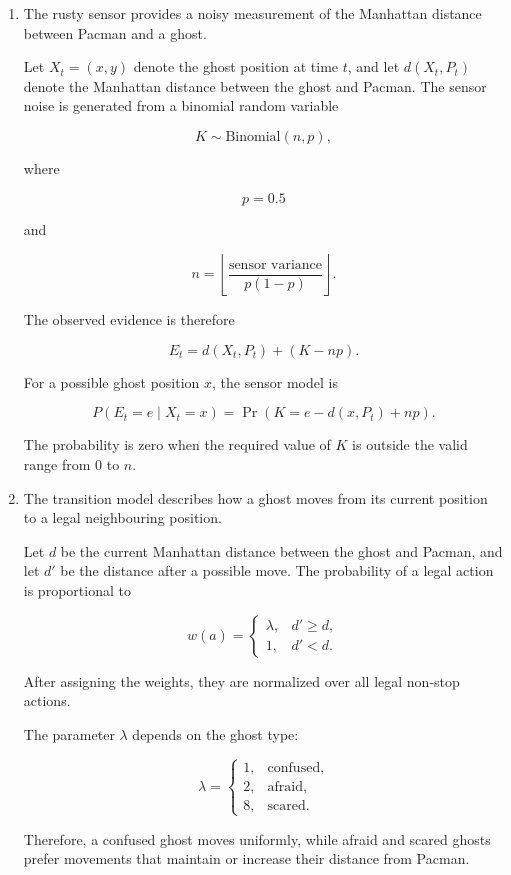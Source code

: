 \documentclass{article}
\begin{document}
\begin{enumerate}[label=\alph*.,leftmargin=*]

    \item
    The rusty sensor provides a noisy measurement of the Manhattan distance
    between Pacman and a ghost.

    Let $X_t=(x,y)$ denote the ghost position at time $t$, and let
    $d(X_t,P_t)$ denote the Manhattan distance between the ghost and Pacman.
    The sensor noise is generated from a binomial random variable

    \[
    K \sim \mathrm{Binomial}(n,p),
    \]

    where

    \[
    p=0.5
    \]

    and

    \[
    n=
    \left\lfloor
    \frac{\text{sensor variance}}{p(1-p)}
    \right\rfloor.
    \]

    The observed evidence is therefore

    \[
    E_t=d(X_t,P_t)+(K-np).
    \]

    For a possible ghost position $x$, the sensor model is

    \[
    P(E_t=e\mid X_t=x)
    =
    \Pr\left(
    K=e-d(x,P_t)+np
    \right).
    \]

    The probability is zero when the required value of $K$ is outside the
    valid range from $0$ to $n$.

    \item
    The transition model describes how a ghost moves from its current
    position to a legal neighbouring position.

    Let $d$ be the current Manhattan distance between the ghost and Pacman,
    and let $d'$ be the distance after a possible move. The probability of
    a legal action is proportional to

    \[
    w(a)=
    \begin{cases}
    \lambda, & d' \geq d,\\
    1, & d' < d.
    \end{cases}
    \]

    After assigning the weights, they are normalized over all legal
    non-stop actions.

    The parameter $\lambda$ depends on the ghost type:

    \[
    \lambda=
    \begin{cases}
    1, & \text{confused},\\
    2, & \text{afraid},\\
    8, & \text{scared}.
    \end{cases}
    \]

    Therefore, a confused ghost moves uniformly, while afraid and scared
    ghosts prefer movements that maintain or increase their distance from
    Pacman.

\end{enumerate}
\end{document}
